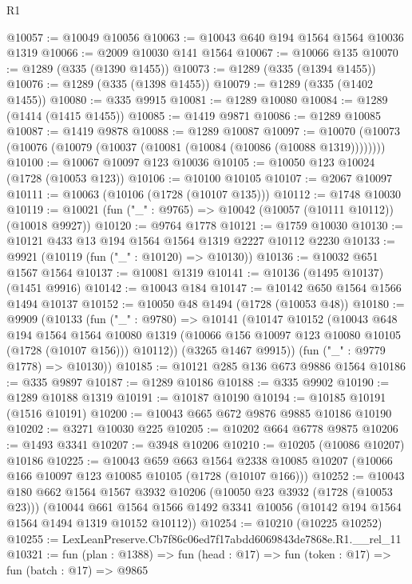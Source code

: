 \begin{lexlean}{R1}
\begin{coremodule}
@10057 := @10049 @10056
@10063 := @10043 @640 @194 @1564 @1564 @10036 @1319
@10066 := @2009 @10030 @141 @1564
@10067 := @10066 @135
@10070 := @1289 (@335 (@1390 @1455))
@10073 := @1289 (@335 (@1394 @1455))
@10076 := @1289 (@335 (@1398 @1455))
@10079 := @1289 (@335 (@1402 @1455))
@10080 := @335 @9915
@10081 := @1289 @10080
@10084 := @1289 (@1414 (@1415 @1455))
@10085 := @1419 @9871
@10086 := @1289 @10085
@10087 := @1419 @9878
@10088 := @1289 @10087
@10097 := @10070 (@10073 (@10076 (@10079 (@10037 (@10081 (@10084 (@10086 (@10088 @1319))))))))
@10100 := @10067 @10097 @123 @10036
@10105 := @10050 @123 @10024 (@1728 (@10053 @123))
@10106 := @10100 @10105
@10107 := @2067 @10097
@10111 := @10063 (@10106 (@1728 (@10107 @135)))
@10112 := @1748 @10030
@10119 := @10021 (fun ("_" : @9765) => @10042 (@10057 (@10111 @10112)) (@10018 @9927))
@10120 := @9764 @1778
@10121 := @1759 @10030
@10130 := @10121 @433 @13 @194 @1564 @1564 @1319 @2227 @10112 @2230
@10133 := @9921 (@10119 (fun ("_" : @10120) => @10130))
@10136 := @10032 @651 @1567 @1564
@10137 := @10081 @1319
@10141 := @10136 (@1495 @10137) (@1451 @9916)
@10142 := @10043 @184
@10147 := @10142 @650 @1564 @1566 @1494 @10137
@10152 := @10050 @48 @1494 (@1728 (@10053 @48))
@10180 := @9909
    (@10133
      (fun ("_" : @9780) =>
      @10141
        (@10147
          @10152
          (@10043
            @648
            @194
            @1564
            @1564
            @10080
            @1319
            (@10066 @156 @10097 @123 @10080 @10105 (@1728 (@10107 @156)))
            @10112))
        (@3265 @1467 @9915))
      (fun ("_" : @9779 @1778) => @10130))
@10185 := @10121 @285 @136 @673 @9886 @1564
@10186 := @335 @9897
@10187 := @1289 @10186
@10188 := @335 @9902
@10190 := @1289 @10188 @1319
@10191 := @10187 @10190
@10194 := @10185 @10191 (@1516 @10191)
@10200 := @10043 @665 @672 @9876 @9885 @10186 @10190
@10202 := @3271 @10030 @225
@10205 := @10202 @664 @6778 @9875
@10206 := @1493 @3341
@10207 := @3948 @10206
@10210 := @10205 (@10086 @10207) @10186
@10225 := @10043
    @659
    @663
    @1564
    @2338
    @10085
    @10207
    (@10066 @166 @10097 @123 @10085 @10105 (@1728 (@10107 @166)))
@10252 := @10043
    @180
    @662
    @1564
    @1567
    @3932
    @10206
    (@10050 @23 @3932 (@1728 (@10053 @23)))
    (@10044 @661 @1564 @1566 @1492 @3341 @10056 (@10142 @194 @1564 @1564 @1494 @1319 @10152 @10112))
@10254 := @10210 (@10225 @10252)
@10255 := LexLeanPreserve.Cb7f86c06ed7f17abdd6069843de7868e.R1.__rel_11
@10321 := fun (plan : @1388) =>
  fun (head : @17) =>
  fun (token : @17) =>
  fun (batch : @17) =>
  @9865

\end{coremodule}
\end{lexlean}
